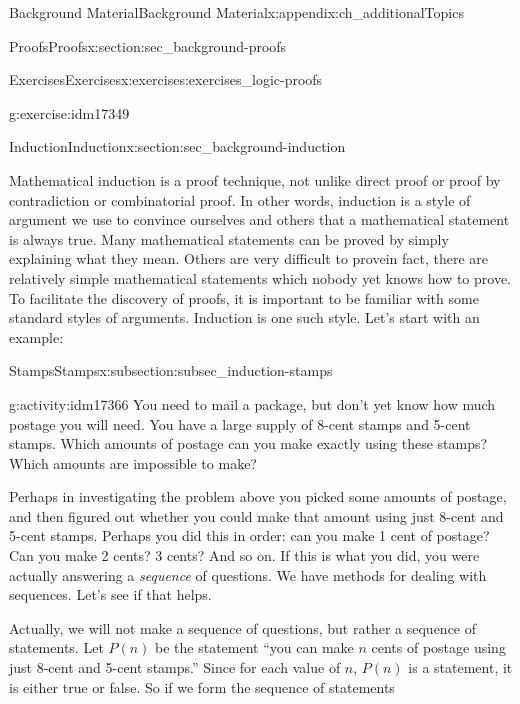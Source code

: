 \documentclass[oneside,10pt,]{book}
\numberwithin{equation}{chapter}
\begin{document}
\begin{appendixptx}{Background Material}{}{Background Material}{}{}{x:appendix:ch_additionalTopics}
\begin{sectionptx}{Proofs}{}{Proofs}{}{}{x:section:sec_background-proofs}
\begin{exercises-subsection}{Exercises}{}{Exercises}{}{}{x:exercises:exercises_logic-proofs}
\begin{divisionexercise}{20}{}{}{g:exercise:idm17349}
\begin{sidebyside}{1}{0.4}{0.4}{0}
\end{sidebyside}%
\end{divisionexercise}%
\end{exercises-subsection}
\end{sectionptx}
%
%
\typeout{************************************************}
\typeout{************************************************}
%
\begin{sectionptx}{Induction}{}{Induction}{}{}{x:section:sec_background-induction}
\begin{introduction}{}%
 Mathematical induction is a proof technique, not unlike direct proof or proof by contradiction or combinatorial proof. In other words, induction is a style of argument we use to convince ourselves and others that a mathematical statement is always true. Many mathematical statements can be proved by simply explaining what they mean. Others are very difficult to prove\textemdash{}in fact, there are relatively simple mathematical statements which nobody yet knows how to prove. To facilitate the discovery of proofs, it is important to be familiar with some standard styles of arguments. Induction is one such style. Let's start with an example:%
\end{introduction}%
%
%
\typeout{************************************************}
\typeout{************************************************}
%
\begin{subsectionptx}{Stamps}{}{Stamps}{}{}{x:subsection:subsec_induction-stamps}
\begin{activity}{}{g:activity:idm17366}%
You need to mail a package, but don't yet know how much postage you will need. You have a large supply of 8-cent stamps and 5-cent stamps. Which amounts of postage can you make exactly using these stamps? Which amounts are impossible to make?%
\end{activity}
Perhaps in investigating the problem above you picked some amounts of postage, and then figured out whether you could make that amount using just 8-cent and 5-cent stamps. Perhaps you did this in order: can you make 1 cent of postage? Can you make 2 cents? 3 cents? And so on. If this is what you did, you were actually answering a \emph{sequence} of questions. We have methods for dealing with sequences. Let's see if that helps.%
\par
Actually, we will not make a sequence of questions, but rather a sequence of statements. Let \(P(n)\)\label{g:notation:idm17372} be the statement ``you can make \(n\) cents of postage using just 8-cent and 5-cent stamps.'' Since for each value of \(n\), \(P(n)\) is a statement, it is either true or false. So if we form the sequence of statements%

\end{subsectionptx}
\end{sectionptx}
\end{appendixptx}
\end{document}
